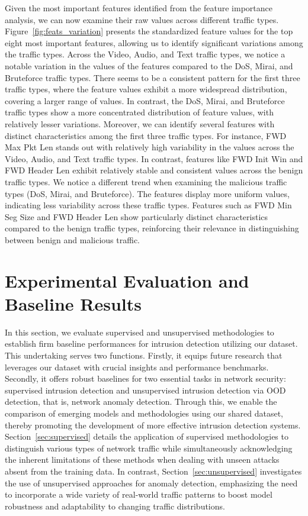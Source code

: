 \documentclass[lettersize,journal]{IEEEtran}
\begin{document}
Given the most important features identified from the feature importance analysis, we can now examine their raw values across different traffic types. Figure~\ref{fig:feats_variation} presents the standardized feature values for the top eight most important features, allowing us to identify significant variations among the traffic types. Across the Video, Audio, and Text traffic types, we notice a notable variation in the values of the features compared to the \ac{DoS}, Mirai, and Bruteforce traffic types. There seems to be a consistent pattern for the first three traffic types, where the feature values exhibit a more widespread distribution, covering a larger range of values. In contrast, the \ac{DoS}, Mirai, and Bruteforce traffic types show a more concentrated distribution of feature values, with relatively lesser variations. Moreover, we can identify several features with distinct characteristics among the first three traffic types. For instance, FWD Max Pkt Len stands out with relatively high variability in the values across the Video, Audio, and Text traffic types. In contrast, features like FWD Init Win and FWD Header Len exhibit relatively stable and consistent values across the benign traffic types. We notice a different trend when examining the malicious traffic types (\ac{DoS}, Mirai, and Bruteforce). The features display more uniform values, indicating less variability across these traffic types. Features such as FWD Min Seg Size and FWD Header Len show particularly distinct characteristics compared to the benign traffic types, reinforcing their relevance in distinguishing between benign and malicious traffic. 

\section{Experimental Evaluation and Baseline Results}\label{sec:experiments}
In this section, we evaluate supervised and unsupervised methodologies to establish firm baseline performances for intrusion detection utilizing our dataset. This undertaking serves two functions. Firstly, it equips future research that leverages our dataset with crucial insights and performance benchmarks. Secondly, it offers robust baselines for two essential tasks in network security: supervised intrusion detection and unsupervised intrusion detection via \ac{OOD} detection, that is, network anomaly detection. Through this, we enable the comparison of emerging models and methodologies using our shared dataset, thereby promoting the development of more effective intrusion detection systems. Section~\ref{sec:supervised} details the application of supervised methodologies to distinguish various types of network traffic while simultaneously acknowledging the inherent limitations of these methods when dealing with unseen attacks absent from the training data. In contrast, Section~\ref{sec:unsupervised} investigates the use of unsupervised approaches for anomaly detection, emphasizing the need to incorporate a wide variety of real-world traffic patterns to boost model robustness and adaptability to changing traffic distributions. 
\end{document}
